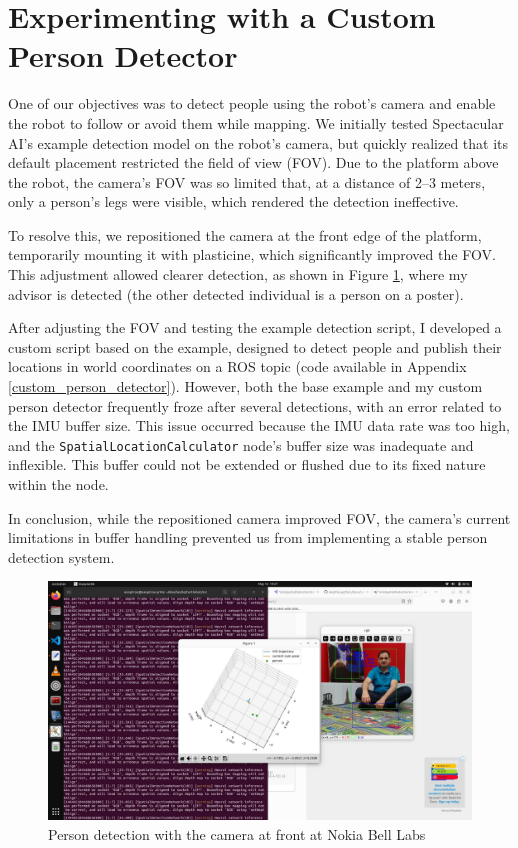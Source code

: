 \section{Experimenting with a Custom Person Detector}

One of our objectives was to detect people using the robot's camera and enable the robot to follow or avoid them while mapping. We initially tested Spectacular AI’s example detection model on the robot’s camera, but quickly realized that its default placement restricted the field of view (FOV). Due to the platform above the robot, the camera’s FOV was so limited that, at a distance of 2–3 meters, only a person’s legs were visible, which rendered the detection ineffective.

To resolve this, we repositioned the camera at the front edge of the platform, temporarily mounting it with plasticine, which significantly improved the FOV. This adjustment allowed clearer detection, as shown in Figure \ref{fig:person_detection_camera_at_front_nokia}, where my advisor is detected (the other detected individual is a person on a poster).

After adjusting the FOV and testing the example detection script, I developed a custom script based on the example, designed to detect people and publish their locations in world coordinates on a ROS topic (code available in Appendix \ref{custom_person_detector}). However, both the base example and my custom person detector frequently froze after several detections, with an error related to the IMU buffer size. This issue occurred because the IMU data rate was too high, and the \verb|SpatialLocationCalculator| node’s buffer size was inadequate and inflexible. This buffer could not be extended or flushed due to its fixed nature within the node.

In conclusion, while the repositioned camera improved FOV, the camera's current limitations in buffer handling prevented us from implementing a stable person detection system.

\begin{figure}[htbp]
    \centering
    \includegraphics[width=150mm, keepaspectratio]{figures_jpg/person_detection_camera_at_front_nokia.jpg}
    \caption{Person detection with the camera at front at Nokia Bell Labs}
    \label{fig:person_detection_camera_at_front_nokia}
\end{figure}

